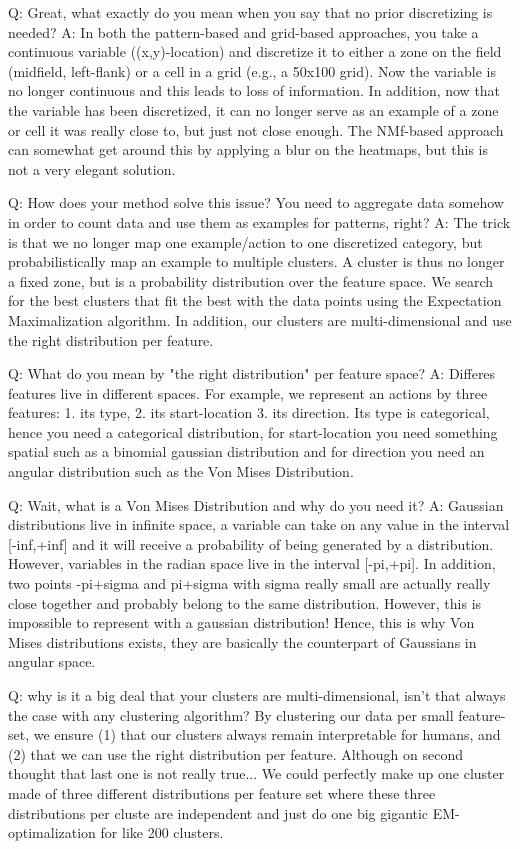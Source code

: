 \documentclass[runningheads]{llncs}
\begin{document}
Q: Great, what exactly do you mean when you say that no prior discretizing is needed?
A: In both the pattern-based and grid-based approaches, you take a continuous variable ((x,y)-location) and discretize it to either a zone on the field (midfield, left-flank) or a cell in a grid (e.g., a 50x100 grid). Now the variable is no longer continuous and this leads to loss of information. In addition, now that the variable has been discretized, it can no longer serve as an example of a zone or cell it was really close to, but just not close enough. The NMf-based approach can somewhat get around this by applying a blur on the heatmaps, but this is not a very elegant solution.

Q: How does your method solve this issue? You need to aggregate data somehow in order to count data and use them as examples for patterns, right?
A: The trick is that we no longer map one example/action to one discretized category, but probabilistically map an example to multiple clusters. A cluster is thus no longer a fixed zone, but is a probability distribution over the feature space. We search for the best clusters that fit the best with the data points using the Expectation Maximalization algorithm. In addition, our clusters are multi-dimensional and use the right distribution per feature.

Q: What do you mean by "the right distribution" per feature space?
A: Differes features live in different spaces. For example, we represent an actions by three features: 1. its type, 2. its start-location 3. its direction. Its type is categorical, hence you need a categorical distribution, for start-location you need something spatial such as a binomial gaussian distribution and for direction you need an angular distribution such as the Von Mises Distribution.

Q: Wait, what is a Von Mises Distribution and why do you need it?
A: Gaussian distributions live in infinite space, a variable can take on any value in the interval [-inf,+inf] and it will receive a probability of being generated by a distribution. However, variables in the radian space live in the interval [-pi,+pi]. In addition, two points -pi+sigma and pi+sigma with sigma really small are actually really close together and probably belong to the same distribution. However, this is impossible to represent with a gaussian distribution! Hence, this is why Von Mises distributions exists, they are basically the counterpart of Gaussians in angular space.

Q: why is it a big deal that your clusters are multi-dimensional, isn't that always the case with any clustering algorithm?
By clustering our data per small feature-set, we ensure (1) that our clusters always remain interpretable for humans, and (2) that we can use the right distribution per feature. Although on second thought that last one is not really true... We could perfectly make up one cluster made of three different distributions per feature set where these three distributions per cluste are independent and just do one big gigantic EM-optimalization for like 200 clusters.
\end{document}
